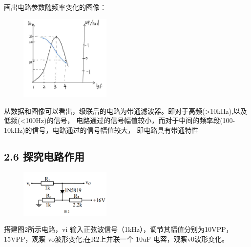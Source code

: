 \documentclass[UTF8]{ctexart}
\begin{document}
画出电路参数随频率变化的图像：

\begin{figure}[htbp]
    \centering
    \includegraphics[width=0.40\textwidth]{2-5频率特性.jpg}
\end{figure}

从数据和图像可以看出，级联后的电路为带通滤波器。即对于高频(>10kHz),以及低频(<100Hz)的信号，
电路通过的信号幅值较小，而对于中间的频率段(100-10kHz)的信号，电路通过的信号幅值较大，
即电路具有带通特性

\subsection*{2.6 探究电路作用}

\begin{figure}[htbp]
    \centering
    \includegraphics[width=0.40\textwidth]{6-电路图.png}
\end{figure}

搭建图2所示电路，vi 输入正弦波信号（1kHz），调节其幅值分别为10VPP，
15VPP，观察 vo波形变化;在R2上并联一个 10uF 电容，观察v0波形变化。

\end{document}
